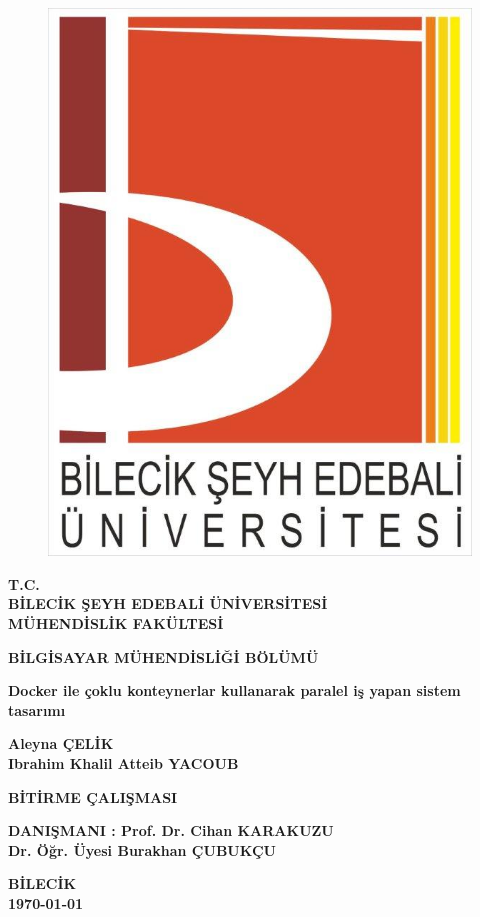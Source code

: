 \thispagestyle{empty}
\begin{figure}[H]
\centering
\includegraphics[scale=0.2]{logomuz}
\end{figure}

\begin{center}
\textbf{T.C.}\\
\textbf{BİLECİK ŞEYH EDEBALİ ÜNİVERSİTESİ}\\
\textbf{MÜHENDİSLİK FAKÜLTESİ}

\textbf{BİLGİSAYAR MÜHENDİSLİĞİ BÖLÜMÜ}
\end{center}
\vfill
\begin{center}
\textbf{Docker ile çoklu konteynerlar kullanarak paralel iş yapan sistem tasarımı}

\textbf{Aleyna ÇELİK \\ Ibrahim Khalil Atteib YACOUB}

\textbf{BİTİRME ÇALIŞMASI}
\end{center}
\vfill
\begin{center}
\textbf{DANIŞMANI : Prof. Dr. Cihan KARAKUZU \\ Dr. Öğr. Üyesi Burakhan ÇUBUKÇU}

\textbf{BİLECİK}\\ 
\textbf{\today}
\end{center}

